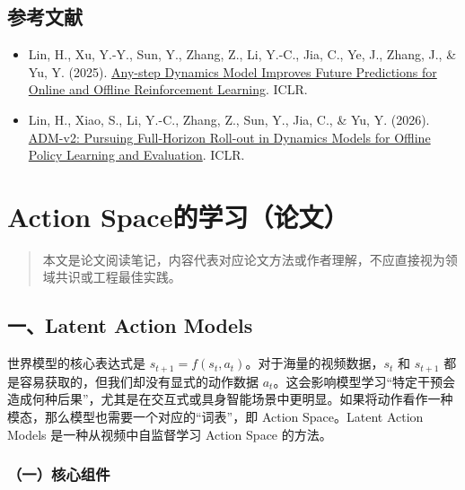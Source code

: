 \hypertarget{ux53c2ux8003ux6587ux732e-187}{%
\subsection{参考文献}\label{ux53c2ux8003ux6587ux732e-187}}

\begin{itemize}
\tightlist
\item
  Lin, H., Xu, Y.-Y., Sun, Y., Zhang, Z., Li, Y.-C., Jia, C., Ye, J., Zhang, J., \& Yu, Y. (2025). \href{https://openreview.net/forum?id=JZCxlrwjZ8}{Any-step Dynamics Model Improves Future Predictions for Online and Offline Reinforcement Learning}. ICLR.
\item
  Lin, H., Xiao, S., Li, Y.-C., Zhang, Z., Sun, Y., Jia, C., \& Yu, Y. (2026). \href{https://openreview.net/forum?id=ICbXEwqpga}{ADM-v2: Pursuing Full-Horizon Roll-out in Dynamics Models for Offline Policy Learning and Evaluation}. ICLR.
\end{itemize}

\clearpage

\hypertarget{action-spaceux7684ux5b66ux4e60ux8bbaux6587}{%
\section{Action Space的学习（论文）}\label{action-spaceux7684ux5b66ux4e60ux8bbaux6587}}

\begin{quote}
本文是论文阅读笔记，内容代表对应论文方法或作者理解，不应直接视为领域共识或工程最佳实践。
\end{quote}

\hypertarget{ux4e00latent-action-models}{%
\subsection{一、Latent Action Models}\label{ux4e00latent-action-models}}

世界模型的核心表达式是 \(s_{t+1}=f(s_t,a_t)\)。对于海量的视频数据，\(s_t\) 和 \(s_{t+1}\) 都是容易获取的，但我们却没有显式的动作数据 \(a_t\)。这会影响模型学习``特定干预会造成何种后果''，尤其是在交互式或具身智能场景中更明显。如果将动作看作一种模态，那么模型也需要一个对应的``词表''，即 Action Space。Latent Action Models 是一种从视频中自监督学习 Action Space 的方法。

\hypertarget{ux4e00ux6838ux5fc3ux7ec4ux4ef6}{%
\subsubsection{（一）核心组件}\label{ux4e00ux6838ux5fc3ux7ec4ux4ef6}}

